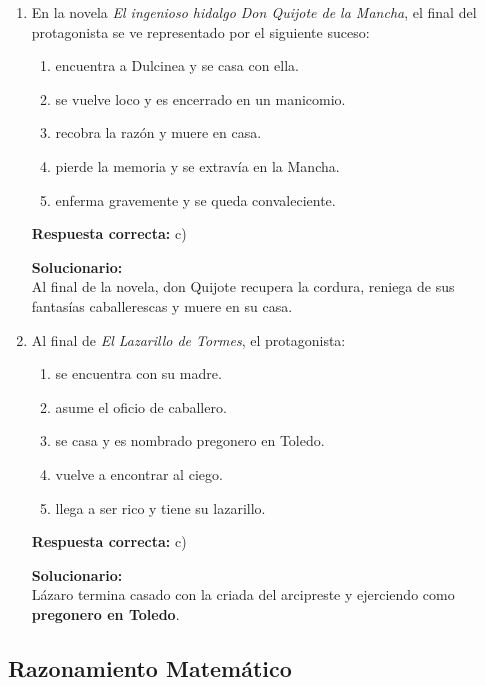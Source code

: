 \begin{enumerate}
	
	\vspace{6mm}
	
	\item En la novela \textit{El ingenioso hidalgo Don Quijote de la Mancha}, el final del protagonista se ve representado por el siguiente suceso:
	\begin{enumerate}[label=\alph*)]
		\item encuentra a Dulcinea y se casa con ella.
		\item se vuelve loco y es encerrado en un manicomio.
		\item recobra la razón y muere en casa.
		\item pierde la memoria y se extravía en la Mancha.
		\item enferma gravemente y se queda convaleciente.
	\end{enumerate}
	\textbf{Respuesta correcta:} c)
	
	\vspace{2mm}
	\textbf{Solucionario:}\\
	Al final de la novela, don Quijote recupera la cordura, reniega de sus fantasías caballerescas y muere en su casa.
	

	
	\vspace{6mm}
	
	\item Al final de \textit{El Lazarillo de Tormes}, el protagonista:
	\begin{enumerate}[label=\alph*)]
		\item se encuentra con su madre.
		\item asume el oficio de caballero.
		\item se casa y es nombrado pregonero en Toledo.
		\item vuelve a encontrar al ciego.
		\item llega a ser rico y tiene su lazarillo.
	\end{enumerate}
	\textbf{Respuesta correcta:} c)
	
	\vspace{2mm}
	\textbf{Solucionario:}\\
	Lázaro termina casado con la criada del arcipreste y ejerciendo como \textbf{pregonero en Toledo}.
	

	
	\vspace{6mm}
\end{enumerate}

\subsection*{Razonamiento Matemático}

